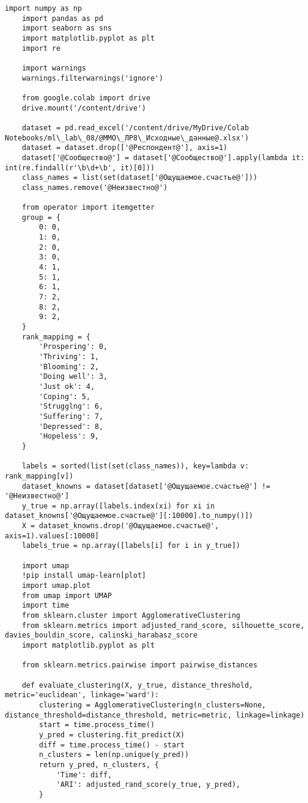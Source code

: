 \begin{lstlisting}[label=lst:1,caption=Кластеризация респондентов социологического исследования]
	import numpy as np
	import pandas as pd
	import seaborn as sns
	import matplotlib.pyplot as plt
	import re
	
	import warnings
	warnings.filterwarnings('ignore')
	
	from google.colab import drive
	drive.mount('/content/drive')
	
	dataset = pd.read_excel('/content/drive/MyDrive/Colab Notebooks/ml\_lab\_08/@ММО\_ЛР8\_Исходные\_данные@.xlsx')
	dataset = dataset.drop(['@Респондент@'], axis=1)
	dataset['@Сообщество@'] = dataset['@Сообщество@'].apply(lambda it: int(re.findall(r'\b\d+\b', it)[0]))
	class_names = list(set(dataset['@Ощущаемое.счастье@']))
	class_names.remove('@Неизвестно@')
	
	from operator import itemgetter
	group = {
		0: 0,
		1: 0,
		2: 0,
		3: 0,
		4: 1,
		5: 1,
		6: 1,
		7: 2,
		8: 2,
		9: 2,
	}
	rank_mapping = {
		'Prospering': 0,
		'Thriving': 1,
		'Blooming': 2,
		'Doing well': 3,
		'Just ok': 4,
		'Coping': 5,
		'Strugglng': 6,
		'Suffering': 7,
		'Depressed': 8,
		'Hopeless': 9,
	}
	
	labels = sorted(list(set(class_names)), key=lambda v: rank_mapping[v])
	dataset_knowns = dataset[dataset['@Ощущаемое.счастье@'] != '@Неизвестно@']
	y_true = np.array([labels.index(xi) for xi in dataset_knowns['@Ощущаемое.счастье@'][:10000].to_numpy()])
	X = dataset_knowns.drop('@Ощущаемое.счастье@', axis=1).values[:10000]
	labels_true = np.array([labels[i] for i in y_true])
	
	import umap
	!pip install umap-learn[plot]
	import umap.plot
	from umap import UMAP
	import time
	from sklearn.cluster import AgglomerativeClustering
	from sklearn.metrics import adjusted_rand_score, silhouette_score, davies_bouldin_score, calinski_harabasz_score
	import matplotlib.pyplot as plt
	
	from sklearn.metrics.pairwise import pairwise_distances
	
	def evaluate_clustering(X, y_true, distance_threshold, metric='euclidean', linkage='ward'):
		clustering = AgglomerativeClustering(n_clusters=None, distance_threshold=distance_threshold, metric=metric, linkage=linkage)
		start = time.process_time()
		y_pred = clustering.fit_predict(X)
		diff = time.process_time() - start
		n_clusters = len(np.unique(y_pred))
		return y_pred, n_clusters, {
			'Time': diff,
			'ARI': adjusted_rand_score(y_true, y_pred),
		}
	

\end{lstlisting}

